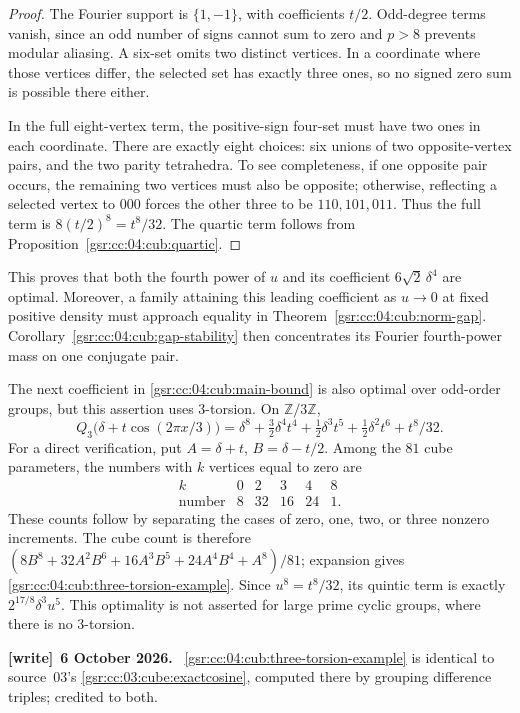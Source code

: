 \documentclass[11pt,letterpaper]{article}
\numberwithin{equation}{section}
\theoremstyle{definition}
\theoremstyle{remark}
\newcommand{\1}{\mathbf 1}
\newenvironment{writenote}[1][]{\par\smallskip\begingroup\small
 \noindent\textbf{[write]}\if\relax\detokenize{#1}\relax\else~\textbf{#1.}\fi\ }%
 {\par\endgroup\smallskip}
\begin{document}
\begin{proof}
The Fourier support is $\{1,-1\}$, with coefficients $t/2$. Odd-degree
terms vanish, since an odd number of signs cannot sum to zero and $p>8$
prevents modular aliasing. A six-set omits two distinct vertices. In a
coordinate where those vertices differ, the selected set has exactly three
ones, so no signed zero sum is possible there either.

In the full eight-vertex term, the positive-sign four-set must have two ones
in each coordinate. There are exactly eight choices: six unions of two
opposite-vertex pairs, and the two parity tetrahedra. To see completeness,
if one opposite pair occurs, the remaining two vertices must also be
opposite; otherwise, reflecting a selected vertex to $000$ forces the other
three to be $110,101,011$. Thus the full term is $8(t/2)^8=t^8/32$.
The quartic term follows from Proposition~\ref{gsr:cc:04:cub:quartic}.
\end{proof}

This proves that both the fourth power of $u$ and its coefficient
$6\sqrt2\,\delta^4$ are optimal. Moreover, a family attaining this leading
coefficient as $u\to0$ at fixed positive density must approach equality in
Theorem~\ref{gsr:cc:04:cub:norm-gap}. Corollary~\ref{gsr:cc:04:cub:gap-stability} then concentrates
its Fourier fourth-power mass on one conjugate pair.

The next coefficient in \eqref{gsr:cc:04:cub:main-bound} is also optimal over odd-order
groups, but this assertion uses $3$-torsion. On $\mathbb Z/3\mathbb Z$,
\begin{equation}
 Q_3\bigl(\delta+t\cos(2\pi x/3)\bigr)
 =\delta^8+\tfrac32\delta^4t^4+\tfrac12\delta^3t^5
              +\tfrac12\delta^2t^6+t^8/32.
 \label{gsr:cc:04:cub:three-torsion-example}
\end{equation}
For a direct verification, put $A=\delta+t$, $B=\delta-t/2$. Among the
$81$ cube parameters, the numbers with $k$ vertices equal to zero are
\[
 \begin{array}{c|rrrrr}
 k&0&2&3&4&8\\\hline
 \text{number}&8&32&16&24&1.
 \end{array}
\]
These counts follow by separating the cases of zero, one, two, or three
nonzero increments. The cube count is therefore
$(8B^8+32A^2B^6+16A^3B^5+24A^4B^4+A^8)/81$; expansion gives
\eqref{gsr:cc:04:cub:three-torsion-example}. Since $u^8=t^8/32$, its quintic term is
exactly $2^{17/8}\delta^3u^5$. This optimality is not asserted for large
prime cyclic groups, where there is no $3$-torsion.
\begin{writenote}[6 October 2026]
\eqref{gsr:cc:04:cub:three-torsion-example} is identical to source~03's \eqref{gsr:cc:03:cube:exactcosine}, computed there by grouping difference triples; credited to both.
\end{writenote}
\end{document}
